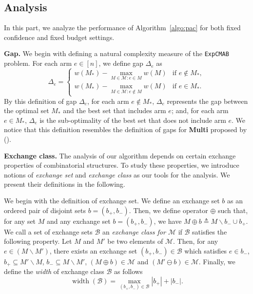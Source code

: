 \documentclass{article}
\newcommand{\Problem}{\texttt{ExpCMAB}\xspace}
\newcommand{\M}{\mathcal M}
\newcommand{\B}{\mathcal B}
\newcommand{\del}{\backslash}
\DeclareMathOperator{\rank}{width}
\newcommand{\MultiIdent}{\textbf{Multi}\xspace}
\begin{document}
\begin{spacing}{1.1}
\subsection{Analysis}
In this part, we analyze the performance of Algorithm~\ref{algo:pac} for both fixed confidence and fixed budget settings. 


\textbf{Gap.} We begin with defining a natural complexity measure of the \Problem problem. 
For each arm $e \in [n]$, we define gap $\Delta_e$ as
\begin{equation}
\label{eq:define-delta}
\Delta_e = \begin{cases}
			   w(M_*)-\max_{M\in \M: e\in M} w(M) & \text{if } e\not \in M_*, \\
			   w(M_*)-\max_{M\in \M: e\not \in M} w(M) & \text{if } e\in M_*.
			\end{cases}
\end{equation}
By this definition of gap $\Delta_e$, for each arm $e\not\in M_*$, $\Delta_e$ represents the gap between the optimal set $M_*$ and the best set that includes arm $e$; and, for each arm $e\in M_*$, $\Delta_e$ is the sub-optimality of the best set that does not include arm $e$.
We notice that this definition resembles the definition of gaps for \MultiIdent proposed by ().



\textbf{Exchange class.} 
The analysis of our algorithm depends on certain exchange properties of combinatorial structures.
To study these properties, we introduce notions of \emph{exchange set} and \emph{exchange class} as our tools for the analysis.
We present their definitions in the following.


We begin with the definition of exchange set. 
We define an exchange set $b$ as an ordered pair of disjoint sets $b=(b_+,b_-)$.
Then, we define operator $\oplus$ such that, for any set $M$ and any exchange set $b=(b_+,b_-)$, we have $M\oplus b \triangleq M\del b_- \cup b_+$.
We call a set of exchange sets $\B$ an \emph{exchange class for $\M$} if $\B$ satisfies the following property.
Let $M$ and $M'$ be two  elements of $\M$.
Then, for any $e \in (M\del M')$, there exists an exchange set $(b_+,b_-)\in \B$ which satisfies $e\in b_-$, $b_+ \subseteq M'\del M$, $b_- \subseteq M \del M'$, $(M\oplus b) \in \M$ and $(M'\ominus b) \in \M$.
Finally, we define the \emph{width} of exchange class $\B$ as follows
$$
\rank(\B) = \max_{(b_+,b_-) \in \B} |b_+|+|b_-|.
$$


\end{spacing}
\end{document}
